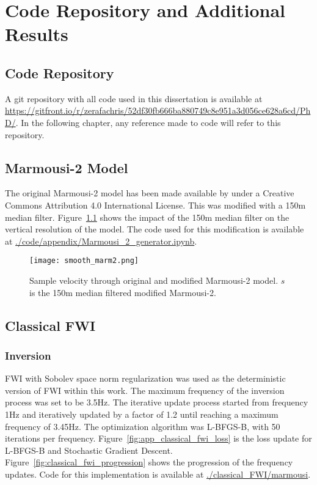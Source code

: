 \chapter[Code and Additional Results]{Code Repository and Additional Results}

\section{Code Repository}\label{sec:app_results_code_repo}
A git repository with all code used in this dissertation is available at \url{https://gitfront.io/r/zerafachris/52df30fb666ba880749c8e951a3d056ce628a6cd/PhD/}. In the following chapter, any reference made to code will refer to this repository.

\section{Marmousi-2 Model}\label{sec:app_results_generation_marm}
The original Marmousi-2 model has been made available by \cite{Martin2006} under a Creative Commons Attribution 4.0 International License. This was modified with a 150m median filter. Figure~\ref{fig:app_smooth_marm_vel_profile} shows the impact of the 150m median filter on the vertical resolution of the model. The code used for this modification is available at \href{https://gitfront.io/r/zerafachris/52df30fb666ba880749c8e951a3d056ce628a6cd/PhD/blob/code/appendix/Marmousi_2_generator.ipynb}{\url{./code/appendix/Marmousi\_2\_generator.ipynb}}.

\begin{figure}[!ht]
    \centering
    \texttt{[image: smooth\_marm2.png]}
    \caption[Sample velocity profile through original and modified Marmousi-2 model.]{Sample velocity through original and modified Marmousi-2 model. $s$ is the 150m median filtered modified Marmousi-2.}
    \label{fig:app_smooth_marm_vel_profile}
\end{figure}

\section{Classical FWI}\label{sec:app_results_classical_FWI}
\subsection{Inversion}
FWI with Sobolev space norm regularization was used as the deterministic version of FWI within this work. The maximum frequency of the inversion process was set to be 3.5\si{Hz}. The iterative update process started from frequency 1\si{Hz} and iteratively updated by a factor of 1.2 until reaching a maximum frequency of 3.45\si{Hz}. The optimization algorithm was L-BFGS-B, with 50 iterations per frequency. Figure~\ref{fig:app_classical_fwi_loss} is the loss update for L-BFGS-B and Stochastic Gradient Descent. Figure~\ref{fig:classical_fwi_progression} shows the progression of the frequency updates. Code for this implementation is available at \href{https://gitfront.io/r/zerafachris/fbeffbcbfa1a363bc271e3bcd3717a830d3bfe7f/academic/tree/PhD/code/classical_FWI/marmousi/*}{\url{./classical\_FWI/marmousi}}.

